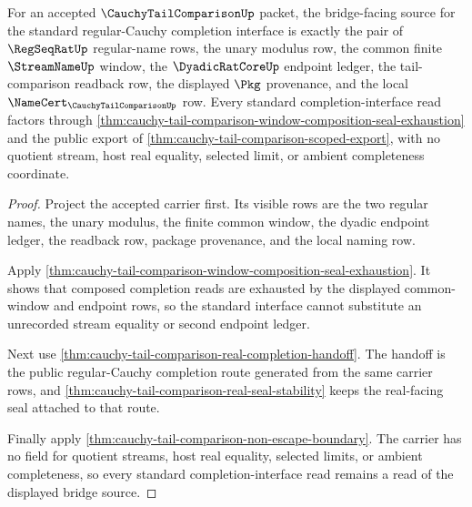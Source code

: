 \begin{theorem}
\label{thm:cauchy-tail-comparison-standard-bridge-source}
For an accepted $\CauchyTailComparisonUp$ packet, the bridge-facing source for the standard regular-Cauchy completion interface is exactly the pair of $\RegSeqRatUp$ regular-name rows, the unary modulus row, the common finite $\StreamNameUp$ window, the $\DyadicRatCoreUp$ endpoint ledger, the tail-comparison readback row, the displayed $\Pkg$ provenance, and the local $\NameCert_{\CauchyTailComparisonUp}$ row. Every standard completion-interface read factors through \autoref{thm:cauchy-tail-comparison-window-composition-seal-exhaustion} and the public export of \autoref{thm:cauchy-tail-comparison-scoped-export}, with no quotient stream, host real equality, selected limit, or ambient completeness coordinate.
\end{theorem}
\begin{proof}
Project the accepted carrier first. Its visible rows are the two regular names, the unary modulus, the finite common window, the dyadic endpoint ledger, the readback row, package provenance, and the local naming row.

Apply \autoref{thm:cauchy-tail-comparison-window-composition-seal-exhaustion}. It shows that composed completion reads are exhausted by the displayed common-window and endpoint rows, so the standard interface cannot substitute an unrecorded stream equality or second endpoint ledger.

Next use \autoref{thm:cauchy-tail-comparison-real-completion-handoff}. The handoff is the public regular-Cauchy completion route generated from the same carrier rows, and \autoref{thm:cauchy-tail-comparison-real-seal-stability} keeps the real-facing seal attached to that route.

Finally apply \autoref{thm:cauchy-tail-comparison-non-escape-boundary}. The carrier has no field for quotient streams, host real equality, selected limits, or ambient completeness, so every standard completion-interface read remains a read of the displayed bridge source.
\end{proof}


